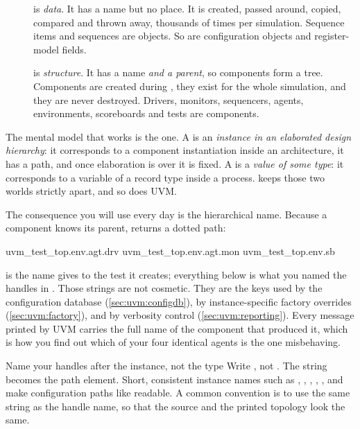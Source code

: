 \begin{description}
  \item[] is \emph{data}. It has a name but no place. It is
        created, passed around, copied, compared and thrown away, thousands
        of times per simulation. Sequence items and sequences are objects.
        So are configuration objects and register-model fields.
  \item[] is \emph{structure}. It has a name
        \emph{and a parent}, so components form a tree. Components are
        created during , they exist for the whole
        simulation, and they are never destroyed. Drivers, monitors,
        sequencers, agents, environments, scoreboards and tests are
        components.
\end{description}

The mental model that works is the \VHDL{} one. A  is an
\emph{instance in an elaborated design hierarchy}: it corresponds to a
component instantiation inside an architecture, it has a path, and once
elaboration is over it is fixed. A  is a
\emph{value of some type}: it corresponds to a variable of a record type
inside a process. \VHDL{} keeps those two worlds strictly apart, and so does
UVM.

%
The consequence you will use every day is the hierarchical name. Because a
component knows its parent,  returns a dotted path:

\begin{txtcode}
uvm_test_top.env.agt.drv
uvm_test_top.env.agt.mon
uvm_test_top.env.sb
\end{txtcode}

 is the name  gives to the test it
creates; everything below is what you named the handles in
. Those strings are not cosmetic. They are the keys used
by the configuration database (\cref{sec:uvm:configdb}), by instance-specific
factory overrides (\cref{sec:uvm:factory}), and by verbosity control
(\cref{sec:uvm:reporting}). Every message printed by UVM carries the full
name of the component that produced it, which is how you find out which of
your four identical agents is the one misbehaving.

\begin{tipbox}{Name your handles after the instance, not the type}
Write , not
. The string becomes the path element.
Short, consistent instance names such as , , ,
, ,  and  make configuration paths
like  readable. A common convention is to use the same
string as the handle name, so that the source and the printed topology look
the same.
\end{tipbox}

